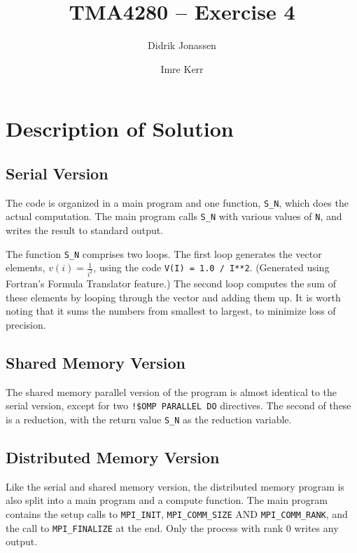 \documentclass[a4paper, 12pt]{article}
\title{TMA4280 -- Exercise 4}
\author{Didrik Jonassen \and Imre Kerr}
\begin{document}
\maketitle

\section{Description of Solution} %
\label{sec:description_of_solution}
    \subsection{Serial Version} %
    \label{sub:serial_version}
        The code is organized in a main program and one function, \texttt{S\_N}, which does the actual computation. The main program calls \texttt{S\_N} with various values of \texttt{N}, and writes the result to standard output.

        The function \texttt{S\_N} comprises two loops. The first loop generates the vector elements, $v(i) = \frac{1}{i^2}$, using the code \texttt{V(I) = 1.0 / I**2}. (Generated using Fortran's Formula Translator feature.) The second loop computes the sum of these elements by looping through the vector and adding them up. It is worth noting that it sums the numbers from smallest to largest, to minimize loss of precision.

    \subsection{Shared Memory Version} %
    \label{sub:shared_memory_version}
        The shared memory parallel version of the program is almost identical to the serial version, except for two \texttt{!\$OMP PARALLEL DO} directives. The second of these is a reduction, with the return value \texttt{S\_N} as the reduction variable.

    \subsection{Distributed Memory Version} %
    \label{sub:distributed_memory_version}
        Like the serial and shared memory version, the distributed memory program is also split into a main program and a compute function. The main program contains the setup calls to \texttt{MPI\_INIT}, \texttt{MPI\_COMM\_SIZE} AND \texttt{MPI\_COMM\_RANK}, and the call to \texttt{MPI\_FINALIZE} at the end. Only the process with rank 0 writes any output.
\end{document}

